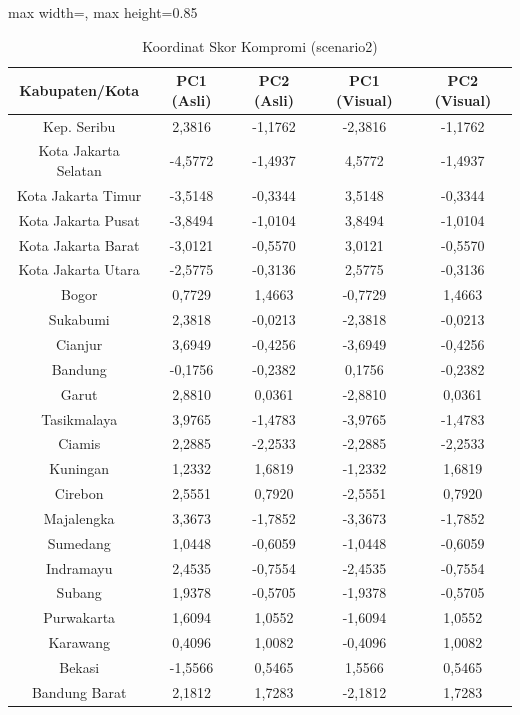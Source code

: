 \begin{table}[H]
\centering
\caption{Koordinat Skor Kompromi (scenario2)} \label{tab:app2scores}
\begin{adjustbox}{max width=\textwidth, max height=0.85\textheight}
\begin{tabular}{|c|c|c|c|c|}
\hline
\textbf{Kabupaten/Kota} & \textbf{PC1 (Asli)} & \textbf{PC2 (Asli)} & \textbf{PC1 (Visual)} & \textbf{PC2 (Visual)} \\
\hline
Kep. Seribu & 2,3816 & -1,1762 & -2,3816 & -1,1762 \\
Kota Jakarta Selatan & -4,5772 & -1,4937 & 4,5772 & -1,4937 \\
Kota Jakarta Timur & -3,5148 & -0,3344 & 3,5148 & -0,3344 \\
Kota Jakarta Pusat & -3,8494 & -1,0104 & 3,8494 & -1,0104 \\
Kota Jakarta Barat & -3,0121 & -0,5570 & 3,0121 & -0,5570 \\
Kota Jakarta Utara & -2,5775 & -0,3136 & 2,5775 & -0,3136 \\
Bogor & 0,7729 & 1,4663 & -0,7729 & 1,4663 \\
Sukabumi & 2,3818 & -0,0213 & -2,3818 & -0,0213 \\
Cianjur & 3,6949 & -0,4256 & -3,6949 & -0,4256 \\
Bandung & -0,1756 & -0,2382 & 0,1756 & -0,2382 \\
Garut & 2,8810 & 0,0361 & -2,8810 & 0,0361 \\
Tasikmalaya & 3,9765 & -1,4783 & -3,9765 & -1,4783 \\
Ciamis & 2,2885 & -2,2533 & -2,2885 & -2,2533 \\
Kuningan & 1,2332 & 1,6819 & -1,2332 & 1,6819 \\
Cirebon & 2,5551 & 0,7920 & -2,5551 & 0,7920 \\
Majalengka & 3,3673 & -1,7852 & -3,3673 & -1,7852 \\
Sumedang & 1,0448 & -0,6059 & -1,0448 & -0,6059 \\
Indramayu & 2,4535 & -0,7554 & -2,4535 & -0,7554 \\
Subang & 1,9378 & -0,5705 & -1,9378 & -0,5705 \\
Purwakarta & 1,6094 & 1,0552 & -1,6094 & 1,0552 \\
Karawang & 0,4096 & 1,0082 & -0,4096 & 1,0082 \\
Bekasi & -1,5566 & 0,5465 & 1,5566 & 0,5465 \\
Bandung Barat & 2,1812 & 1,7283 & -2,1812 & 1,7283 \\

\end{tabular}
\end{adjustbox}
\end{table}
